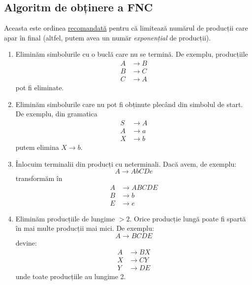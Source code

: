 \subsection*{Algoritm de obținere a FNC}
Aceasta este ordinea \href{https://en.wikipedia.org/wiki/Chomsky_normal_form#Order_of_transformations}{recomandată} pentru că limitează numărul de producții care apar în final (altfel, putem avea un număr \emph{exponențial} de producții).
\begin{enumerate}
    \item Eliminăm simbolurile cu o buclă care nu se termină. De exemplu, producțiile
          \begin{align*}
              A & \to B \\
              B & \to C \\
              C & \to A
          \end{align*}
          pot fi eliminate.

    \item Eliminăm simbolurile care nu pot fi obținute plecând din simbolul de start. De exemplu, din gramatica
          \begin{align*}
              S & \to A \\
              A & \to a \\
              X & \to b
          \end{align*}
          putem elimina \(X \to b\).

    \item Înlocuim terminalii din producți cu neterminali. Dacă avem, de exemplu:
          \[A \to AbCDe\]
          transformăm în
          \begin{align*}
              A & \to ABCDE \\
              B & \to b     \\
              E & \to e
          \end{align*}

    \item Eliminăm producțiile de lungime \(> 2\). Orice producție lungă poate fi spartă în mai multe producții mai mici. De exemplu:
          \[A \to BCDE\]
          devine:
          \begin{align*}
              A & \to BX \\
              X & \to CY \\
              Y & \to DE
          \end{align*}
          unde toate producțiile au lungime 2.


\end{enumerate}
